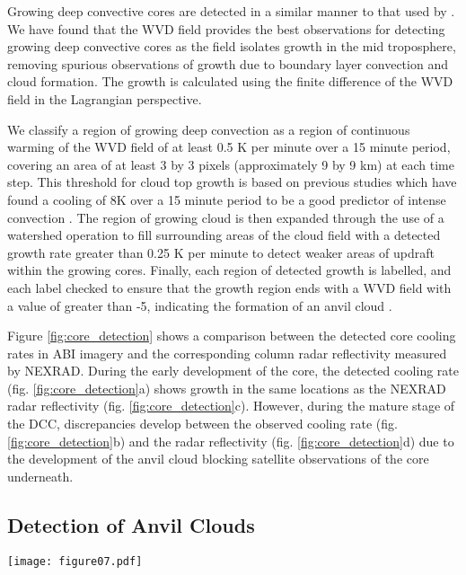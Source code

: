 Growing deep convective cores are detected in a similar manner to that used by \citet{zinner_cb-tram:_2008}.
We have found that the WVD field provides the best observations for detecting growing deep convective cores as the field isolates growth in the mid troposphere, removing spurious observations of growth due to boundary layer convection and cloud formation.
The growth is calculated using the finite difference of the WVD field in the Lagrangian perspective.

We classify a region of growing deep convection as a region of continuous warming of the WVD field of at least 0.5 \unit{K} per minute over a 15 minute period, covering an area of at least 3 by 3 pixels (approximately 9 by 9 km) at each time step.
This threshold for cloud top growth is based on previous studies which have found a cooling of 8\unit{K} over a 15 minute period to be a good predictor of intense convection \citep{roberts_nowcasting_2003, hartung_intercomparison_2013}.
The region of growing cloud is then expanded through the use of a watershed operation to fill surrounding areas of the cloud field with a detected growth rate greater than 0.25 \unit{K} per minute to detect weaker areas of updraft within the growing cores.
Finally, each region of detected growth is labelled, and each label checked to ensure that the growth region ends with a WVD field with a value of greater than -5, indicating the formation of an anvil cloud \citep{muller_role_2018}.

Figure \ref{fig:core_detection} shows a comparison between the detected core cooling rates in ABI imagery and the corresponding column radar reflectivity measured by NEXRAD. 
During the early development of the core, the detected cooling rate (fig. \ref{fig:core_detection}a) shows growth in the same locations as the NEXRAD radar reflectivity (fig. \ref{fig:core_detection}c).
However, during the mature stage of the DCC, discrepancies develop between the observed cooling rate (fig.\ref{fig:core_detection}b) and the radar reflectivity (fig. \ref{fig:core_detection}d) due to the development of the anvil cloud blocking satellite observations of the core underneath.

\subsection{Detection of Anvil Clouds}

\begin{figure*}[t]
    \texttt{[image: figure07.pdf]}
    \caption{Detection of anvil cloud extent for the mature DCC cluster in \ref{fig:compare_sat_radar_glm} using the edge gradient method. a.: The combined field of the WVD minus the SWD, to isolate the thick anvil, between the upper and lower thresholds of -5 and -15\unit{K} respectively. b.: the detected edge gradient magnitude of the field between these thresholds, which is used to detect the outer extend of the thick anvil cloud. c.: the combined field of WVD plus the SWD, to enhance the thin anvil, and d.: the calculated edge magnitude of this field.}
    \label{fig:edge_detection}
\end{figure*}

